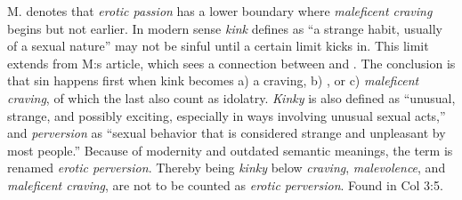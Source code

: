 M. denotes that \emph{erotic passion} has a lower boundary where \emph{maleficent craving} begins but not earlier. In modern sense \emph{kink} defines as ``a strange habit, usually of a sexual nature'' may not be sinful until a certain limit kicks in. This limit extends from M:s article, which sees a connection between  and . The conclusion is that sin happens first when kink becomes a) a craving, b) , or c) \emph{maleficent craving}, of which the last also count as idolatry. \emph{Kinky} is also defined as ``unusual, strange, and possibly exciting, especially in ways involving unusual sexual acts,'' and \emph{perversion} as ``sexual behavior that is considered strange and unpleasant by most people.'' Because of modernity and outdated semantic meanings, the term is renamed \emph{erotic perversion}. Thereby being \emph{kinky} below \emph{craving}, \emph{malevolence}, and \emph{maleficent craving}, are not to be counted as \emph{erotic perversion}. 
Found in Col 3:5.
